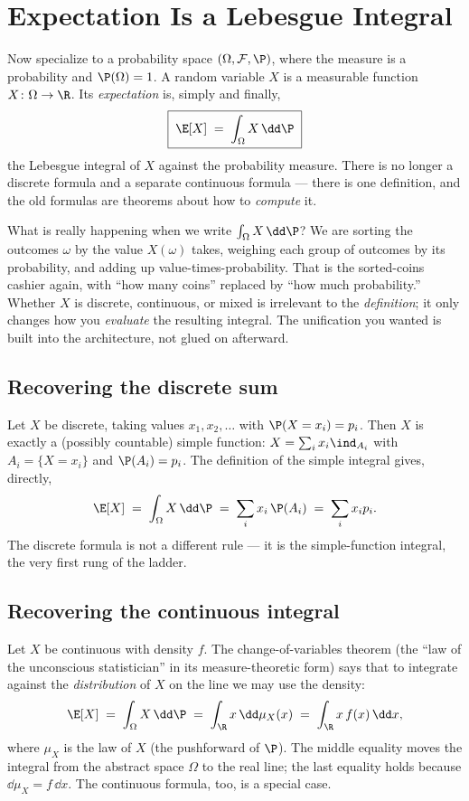 \section{Expectation Is a Lebesgue Integral}
\label{ch37:expectation}

Now specialize to a probability space $(\Omega,\mathcal F,\P)$, where the measure
is a probability and $\P(\Omega)=1$. A random variable $X$ is a measurable
function $X\colon\Omega\to\R$. Its \emph{expectation} is, simply and finally,
\[
  \boxed{\;\E[X] \;=\; \int_\Omega X\,\dd\P\;}
\]
the Lebesgue integral of $X$ against the probability measure. There is no longer
a discrete formula and a separate continuous formula --- there is one
definition, and the old formulas are theorems about how to \emph{compute} it.

\begin{happeningbox}
What is really happening when we write $\int_\Omega X\,\dd\P$? We are sorting the
outcomes $\omega$ by the value $X(\omega)$ takes, weighing each group of
outcomes by its probability, and adding up value-times-probability. That is the
sorted-coins cashier again, with ``how many coins'' replaced by ``how much
probability.'' Whether $X$ is discrete, continuous, or mixed is irrelevant to
the \emph{definition}; it only changes how you \emph{evaluate} the resulting
integral. The unification you wanted is built into the architecture, not glued
on afterward.
\end{happeningbox}

\subsection{Recovering the discrete sum}

Let $X$ be discrete, taking values $x_1,x_2,\dots$ with $\P(X=x_i)=p_i$. Then
$X$ is exactly a (possibly countable) simple function: $X=\sum_i x_i
\ind_{A_i}$ with $A_i=\{X=x_i\}$ and $\P(A_i)=p_i$. The definition of the simple
integral gives, directly,
\[
  \E[X] \;=\; \int_\Omega X\,\dd\P \;=\; \sum_i x_i\,\P(A_i) \;=\; \sum_i x_i p_i .
\]
The discrete formula is not a different rule --- it is the simple-function
integral, the very first rung of the ladder.

\subsection{Recovering the continuous integral}

Let $X$ be continuous with density $f$. The change-of-variables theorem (the
``law of the unconscious statistician'' in its measure-theoretic form) says that
to integrate against the \emph{distribution} of $X$ on the line we may use the
density:
\[
  \E[X] \;=\; \int_\Omega X\,\dd\P \;=\; \int_\R x \,\dd\mu_X(x) \;=\; \int_\R x\,
  f(x)\,\dd x ,
\]
where $\mu_X$ is the law of $X$ (the pushforward of $\P$). The middle equality
moves the integral from the abstract space $\Omega$ to the real line; the last
equality holds because $\dd\mu_X = f\,\dd x$. The continuous formula, too, is a
special case.

